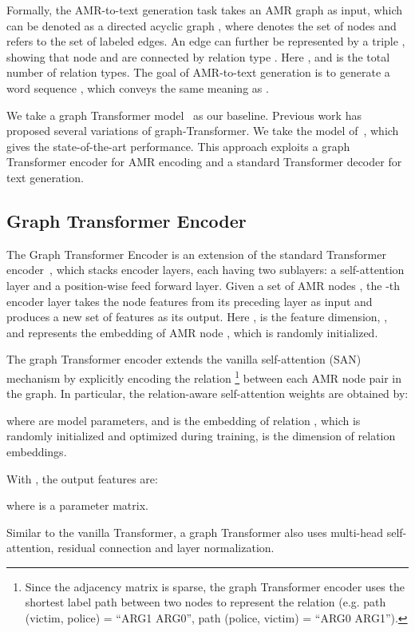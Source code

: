 \documentclass[11pt,a4paper]{article}
\begin{document}
Formally, the AMR-to-text generation task takes an AMR graph as input, which can be denoted as a directed acyclic graph , where  denotes the set of nodes and  refers to the set of labeled edges.
An edge can further be represented by a triple , showing that node  and  are connected by relation type .
Here , and  is the total number of relation types.
The goal of AMR-to-text generation is to generate a word sequence , which conveys the same meaning as .


We take a graph Transformer model~\cite{koncel2019text,zhu2019modeling,cai2020graph,wang2020amr} as our baseline. Previous work has proposed several variations of graph-Transformer.
We take the model of~\citet{zhu2019modeling}, which gives the state-of-the-art performance.
This approach exploits a graph Transformer encoder for AMR encoding and a standard Transformer decoder for text generation.

\subsection{Graph Transformer Encoder}
\label{sec:graphencoder}
The Graph Transformer Encoder is an extension of the standard Transformer encoder~\cite{vaswani2017attention}, which stacks  encoder layers,  each having two sublayers: a self-attention layer and a position-wise feed forward layer.
Given a set of AMR nodes , the -th encoder layer takes the node features  from its preceding layer as input and produces a new set of features  as its output.
Here ,  is the feature dimension, , and  represents the embedding of AMR node , which is randomly initialized. 

The graph Transformer encoder extends the vanilla self-attention ({SAN}) mechanism by explicitly encoding the
relation \footnote{Since the adjacency matrix is sparse, the graph Transformer encoder uses the shortest label path between two nodes to represent the relation (e.g. path (victim, police) = ``ARG1 ARG0'', path (police, victim) = ``ARG0 ARG1'').} between each AMR node pair  in the graph. 
In particular, the relation-aware self-attention weights are obtained by:

where  are model parameters, and  is the embedding of relation , which is randomly initialized and optimized during training,  is the dimension of relation embeddings. 

With , the output features are:

where  is a parameter matrix.

Similar to the vanilla Transformer, a graph Transformer also uses multi-head self-attention, residual connection and layer normalization.
\end{document}
